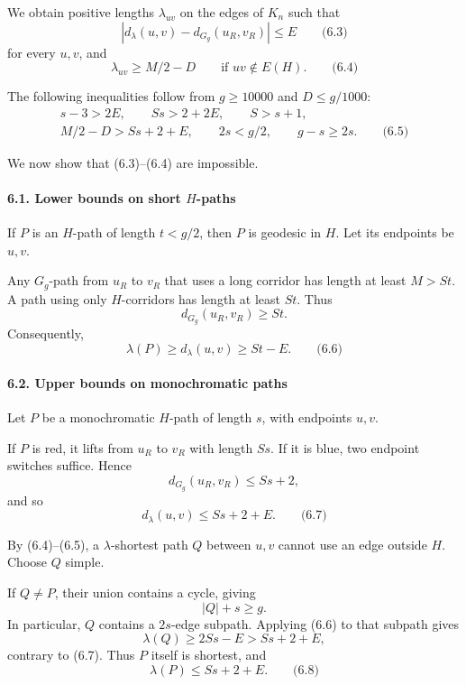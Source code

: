 \documentclass[
  11pt,
  a4paper,
]{article}
\begin{document}
We obtain positive lengths \(\lambda_{uv}\) on the edges of \(K_n\) such
that \[
|d_\lambda(u,v)-d_{G_g}(u_R,v_R)|\le E
\qquad\text{(6.3)}
\] for every \(u,v\), and \[
\lambda_{uv}\ge M/2-D
\qquad\text{if }uv\notin E(H).
\qquad\text{(6.4)}
\]

The following inequalities follow from \(g\ge10000\) and
\(D\le g/1000\): \begin{equation*}
\begin{gathered}
s-3>2E,\qquad Ss>2+2E,\qquad S>s+1,\\
M/2-D>Ss+2+E,\qquad 2s<g/2,\qquad g-s\ge2s.
\qquad\text{(6.5)}
\end{gathered}
\end{equation*}

We now show that (6.3)--(6.4) are impossible.

\paragraph{\texorpdfstring{6.1. Lower bounds on short
\(H\)-paths}{6.1. Lower bounds on short H-paths}}\label{lower-bounds-on-short-h-paths}

If \(P\) is an \(H\)-path of length \(t<g/2\), then \(P\) is geodesic in
\(H\). Let its endpoints be \(u,v\).

Any \(G_g\)-path from \(u_R\) to \(v_R\) that uses a long corridor has
length at least \(M>St\). A path using only \(H\)-corridors has length
at least \(St\). Thus \[
d_{G_g}(u_R,v_R)\ge St.
\] Consequently, \[
\lambda(P)\ge d_\lambda(u,v)\ge St-E.
\qquad\text{(6.6)}
\]

\paragraph{6.2. Upper bounds on monochromatic
paths}\label{upper-bounds-on-monochromatic-paths}

Let \(P\) be a monochromatic \(H\)-path of length \(s\), with endpoints
\(u,v\).

If \(P\) is red, it lifts from \(u_R\) to \(v_R\) with length \(Ss\). If
it is blue, two endpoint switches suffice. Hence \[
d_{G_g}(u_R,v_R)\le Ss+2,
\] and so \[
d_\lambda(u,v)\le Ss+2+E.
\qquad\text{(6.7)}
\]

By (6.4)--(6.5), a \(\lambda\)-shortest path \(Q\) between \(u,v\)
cannot use an edge outside \(H\). Choose \(Q\) simple.

If \(Q\ne P\), their union contains a cycle, giving \[
|Q|+s\ge g.
\] In particular, \(Q\) contains a \(2s\)-edge subpath. Applying (6.6)
to that subpath gives \[
\lambda(Q)\ge2Ss-E>Ss+2+E,
\] contrary to (6.7). Thus \(P\) itself is shortest, and \[
\lambda(P)\le Ss+2+E.
\qquad\text{(6.8)}
\]
\end{document}
